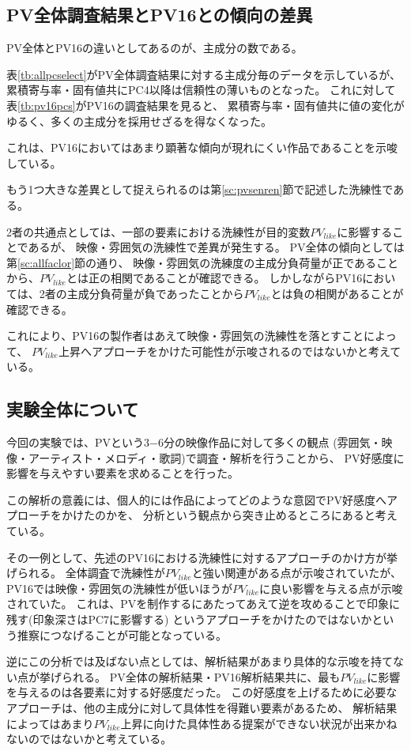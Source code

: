 \documentclass[11pt,a4paper, uplatex]{jsarticle}
\begin{document}
\subsection{PV全体調査結果とPV16との傾向の差異}
PV全体とPV16の違いとしてあるのが、主成分の数である。

表\ref{tb:allpcselect}がPV全体調査結果に対する主成分毎のデータを示しているが、
累積寄与率・固有値共にPC4以降は信頼性の薄いものとなった。
これに対して表\ref{tb:pv16pcs}がPV16の調査結果を見ると、
累積寄与率・固有値共に値の変化がゆるく、多くの主成分を採用せざるを得なくなった。

これは、PV16においてはあまり顕著な傾向が現れにくい作品であることを示唆している。


もう1つ大きな差異として捉えられるのは第\ref{sc:pvsenren}節で記述した洗練性である。

2者の共通点としては、一部の要素における洗練性が目的変数$PV_{like}$に影響することであるが、
映像・雰囲気の洗練性で差異が発生する。
PV全体の傾向としては第\ref{sc:allfaclor}節の通り、
映像・雰囲気の洗練度の主成分負荷量が正であることから、$PV_{like}$とは正の相関であることが確認できる。
しかしながらPV16においては、2者の主成分負荷量が負であったことから$PV_{like}$とは負の相関があることが確認できる。

これにより、PV16の製作者はあえて映像・雰囲気の洗練性を落とすことによって、
$PV_{like}$上昇へアプローチをかけた可能性が示唆されるのではないかと考えている。

\subsection{実験全体について}
今回の実験では、PVという3−6分の映像作品に対して多くの観点
(雰囲気・映像・アーティスト・メロディ・歌詞)で調査・解析を行うことから、
PV好感度に影響を与えやすい要素を求めることを行った。

この解析の意義には、個人的には作品によってどのような意図でPV好感度へアプローチをかけたのかを、
分析という観点から突き止めるところにあると考えている。

その一例として、先述のPV16における洗練性に対するアプローチのかけ方が挙げられる。
全体調査で洗練性が$PV_{like}$と強い関連がある点が示唆されていたが、
PV16では映像・雰囲気の洗練性が低いほうが$PV_{like}$に良い影響を与える点が示唆されていた。
これは、PVを制作するにあたってあえて逆を攻めることで印象に残す(印象深さはPC7に影響する)
というアプローチをかけたのではないかという推察につなげることが可能となっている。

逆にこの分析では及ばない点としては、解析結果があまり具体的な示唆を持てない点が挙げられる。
PV全体の解析結果・PV16解析結果共に、最も$PV_{like}$に影響を与えるのは各要素に対する好感度だった。
この好感度を上げるために必要なアプローチは、他の主成分に対して具体性を得難い要素があるため、
解析結果によってはあまり$PV_{like}$上昇に向けた具体性ある提案ができない状況が出来かねないのではないかと考えている。
\end{document}
